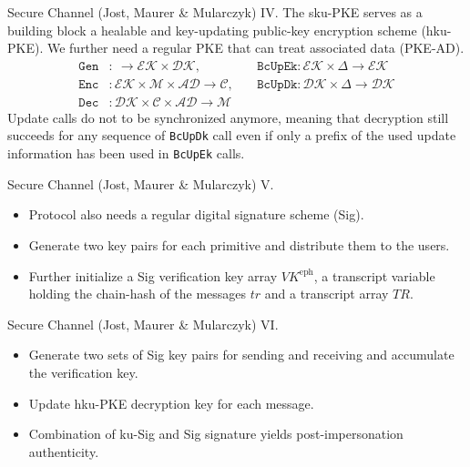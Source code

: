 \documentclass{beamer}
\renewcommand{\t}{\text}
\begin{document}
\begin{frame}{Secure Channel (Jost, Maurer \& Mularczyk) IV.}
  The sku-PKE serves as a building block a healable and key-updating
  public-key encryption scheme (hku-PKE). We further need a regular
  PKE that can treat associated data (PKE-AD).
  \begin{align*}
    \texttt{Gen} & : \ \rightarrow \mathcal{EK} \times \mathcal{DK}, \ &&
    \texttt{BcUpEk} : \mathcal{EK} \times \Delta \rightarrow \mathcal{EK} \\
    \texttt{Enc} & : \mathcal{EK} \times \mathcal{M} \times \mathcal{AD}
                   \rightarrow \mathcal{C}, \ &&
    \texttt{BcUpDk} : \mathcal{DK} \times \Delta \rightarrow \mathcal{DK} \\
    \texttt{Dec} & : \mathcal{DK} \times \mathcal{C} \times \mathcal{AD}
                   \rightarrow \mathcal{M}
  \end{align*}
  Update calls do not to be synchronized anymore, meaning that decryption still
  succeeds for any sequence of \texttt{BcUpDk} call even if only a prefix
  of the used update information has been used in \texttt{BcUpEk} calls.
\end{frame}

\begin{frame}{Secure Channel (Jost, Maurer \& Mularczyk) V.}
  \scriptsize
  \begin{figure}[ht]
     \centering
     \setlength{\fboxsep}{10pt}
     \scalebox{0.6}{%
       \fbox{%
         
       }
     }
  \end{figure}
  \begin{itemize}
  \item Protocol also needs a regular digital signature scheme (Sig).
  \item Generate two key pairs for each primitive and distribute them to the users.
  \item Further initialize a Sig verification key array $VK^\t{eph}$, a transcript
    variable holding the chain-hash of the messages $tr$ and a transcript array $TR$.
  \end{itemize}
\end{frame}

\begin{frame}{Secure Channel (Jost, Maurer \& Mularczyk) VI.}
  \scriptsize
  \begin{figure}[ht]
     \centering
     \setlength{\fboxsep}{10pt}
     \scalebox{0.6}{%
       \fbox{%
         
       }
     }
  \end{figure}
  \begin{itemize}
  \item Generate two sets of Sig key pairs for sending and receiving and
    accumulate the verification key.
  \item Update hku-PKE decryption key for each message.
  \item Combination of ku-Sig and Sig signature yields post-impersonation
    authenticity.
  \end{itemize}
\end{frame}
\end{document}
